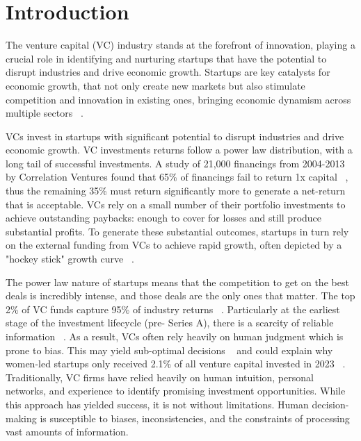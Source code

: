 \documentclass[a4paper, oneside]{discothesis}
\begin{document}
\chapter{Introduction}

The venture capital (VC) industry stands at the forefront of innovation, playing a crucial role
in identifying and nurturing startups that have the potential to disrupt industries and drive
economic growth. Startups are key catalysts for economic growth, 
that not only create new markets but also stimulate competition and innovation in existing ones, bringing economic dynamism across multiple sectors ~\cite{acs}. 

VCs invest in startups with significant potential to disrupt industries and drive economic growth. 
VC investments returns follow a power law distribution, with a long tail of successful investments. 
A study of 21,000 financings from 2004-2013 by Correlation Ventures found that 65\% of financings fail to return 1x capital ~\cite{levine2014venture}, 
thus the remaining 35\% must return significantly more to generate a net-return that is acceptable. 
VCs rely on a small number of their portfolio investments to achieve outstanding paybacks: enough to cover for losses and
still produce substantial profits. To generate these substantial outcomes, startups in turn rely on the external funding from VCs
to achieve rapid growth, often depicted by a "hockey stick" growth curve ~\cite{marmer}.

The power law nature of startups means that the competition to get on the best deals is incredibly intense, and those 
deals are the only ones that matter. The top 2\% of VC funds capture 95\% of industry
returns ~\cite{bai}. Particularly at the earliest stage of the investment lifecycle (pre- Series A), there is a scarcity of
reliable information ~\cite{dellermann}. As a result, VCs often rely heavily on human judgment which is prone to bias. 
This may yield sub-optimal decisions ~\cite{cummingdai} and could explain why women-led startups only received 2.1\% of all venture capital invested in 2023 ~\cite{pitchbook2024vc}.
Traditionally, VC firms have relied heavily on human intuition, personal networks, and experience
to identify promising investment opportunities. While this approach has yielded success, it is
not without limitations. Human decision-making is susceptible to biases, inconsistencies, and the
constraints of processing vast amounts of information.
\end{document}
